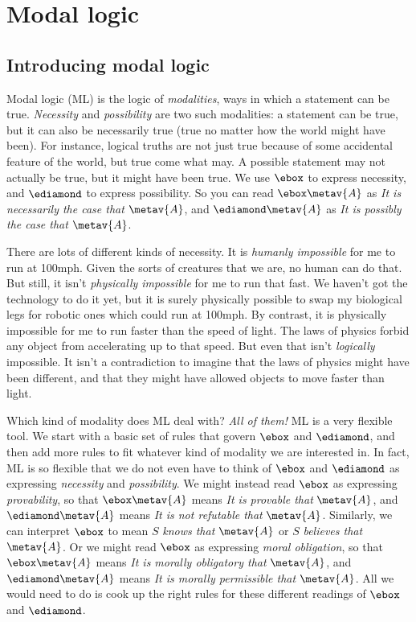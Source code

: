 
\part{Modal logic}
\label{ch.ML}

\chapter{Introducing modal logic}
\label{Intro}

Modal logic (ML) is the logic of \emph{modalities}, ways in which a statement can be true. \emph{Necessity} and \emph{possibility} are two such modalities: a statement can be true, but it can also be necessarily true (true no matter how the world might have been). For instance, logical truths are not just true because of some accidental feature of the world, but true come what may. A possible statement may not actually be true, but it might have been true. We use $\ebox$ to express necessity, and $\ediamond$ to express possibility. So you can read $\ebox \metav{A}$ as \emph{It is necessarily the case that} $\metav{A}$, and $\ediamond \metav{A}$ as \emph{It is possibly the case that} $\metav{A}$.

There are lots of different kinds of necessity. It is \emph{humanly impossible} for me to run at 100mph. Given the sorts of creatures that we are, no human can do that. But still, it isn't \emph{physically impossible} for me to run that fast. We haven't got the technology to do it yet, but it is surely physically possible to swap my biological legs for robotic ones which could run at 100mph. By contrast, it is physically impossible for me to run faster than the speed of light. The laws of physics forbid any object from accelerating up to that speed. But even that isn't \emph{logically} impossible. It isn't a contradiction to imagine that the laws of physics might have been different, and that they might have allowed objects to move faster than light.

Which kind of modality does ML deal with? \emph{All of them!} ML is a very flexible tool. We start with a basic set of rules that govern $\ebox$ and $\ediamond$, and then add more rules to fit whatever kind of modality we are interested in. In fact, ML is so flexible that we do not even have to think of $\ebox$ and $\ediamond$ as expressing \emph{necessity} and \emph{possibility}. We might instead read $\ebox$ as expressing \emph{provability}, so that $\ebox\metav{A}$ means \emph{It is provable that} $\metav{A}$, and $\ediamond\metav{A}$ means \emph{It is not refutable that} $\metav{A}$. Similarly, we can interpret $\ebox$ to mean $S$ \emph{knows that $\metav{A}$} or $S$ \emph{believes that $\metav{A}$}. Or we might read $\ebox$ as expressing \emph{moral obligation}, so that $\ebox \metav{A}$ means \emph{It is morally obligatory that} $\metav{A}$, and $\ediamond \metav{A}$ means \emph{It is morally permissible that} $\metav{A}$. All we would need to do is cook up the right rules for these different readings of $\ebox$ and $\ediamond$.


